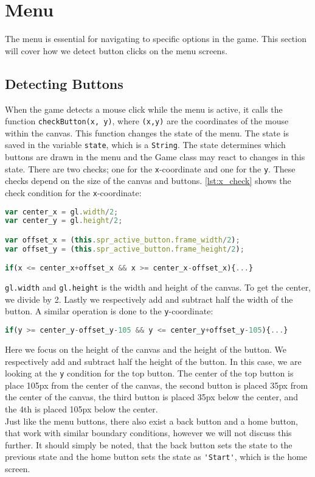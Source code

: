 \section{Menu}
\label{sec:imp_menu}

The menu is essential for navigating to specific options in the game. This section will cover how we detect button clicks on the menu screens.

\subsection{Detecting Buttons}

When the game detects a mouse click while the menu is active, it calls the function \texttt{checkButton(x, y)}, where \texttt{(x,y)} are the coordinates of the mouse within the canvas. This function changes the state of the menu. The state is saved in the variable \verb|state|, which is a \verb|String|. The state determines which buttons are drawn in the menu and the Game class may react to changes in this state. There are two checks; one for the \texttt{x}-coordinate and one for the \texttt{y}. These checks depend on the size of the canvas and buttons. \autoref{lst:x_check} shows the check condition for the \texttt{x}-coordinate:

\begin{lstlisting}[language=JavaScript, caption=x condition check for menu buttons, label=lst:x_check]
var center_x = gl.width/2;
var center_y = gl.height/2;

var offset_x = (this.spr_active_button.frame_width/2);
var offset_y = (this.spr_active_button.frame_height/2);

if(x <= center_x+offset_x && x >= center_x-offset_x){...}
\end{lstlisting}

\verb|gl.width| and \verb|gl.height| is the width and height of the canvas. To get the center, we divide by 2. Lastly we respectively add and subtract half the width of the button. A similar operation is done to the \texttt{y}-coordinate:

\begin{lstlisting}[language=JavaScript, caption=y condition check for menu buttons]
if(y >= center_y-offset_y-105 && y <= center_y+offset_y-105){...}
\end{lstlisting}

Here we focus on the height of the canvas and the height of the button. We respectively add and subtract half the height of the button. In this case, we are looking at the \texttt{y} condition for the top button. The center of the top button is place 105px from the center of the canvas, the second button is placed 35px from the center of the canvas, the third button is placed 35px below the center, and the 4th is placed 105px below the center.\\

Just like the menu buttons, there also exist a back button and a home button, that work with similar boundary conditions, however we will not discuss this further. It should simply be noted, that the back button sets the state to the previous state and the home button sets the state as \verb|'Start'|, which is the home screen.